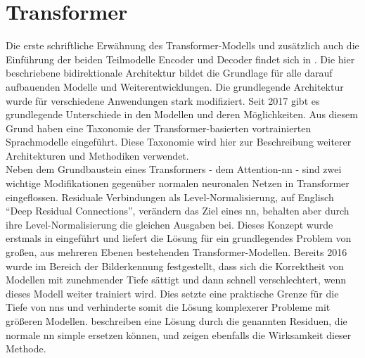 \section{Transformer}\label{sec:transformer}
%
Die erste schriftliche Erwähnung des Transformer-Modells und zusätzlich auch die Einführung der beiden Teilmodelle Encoder und Decoder findet sich in \citet{attention}.
Die hier beschriebene bidirektionale Architektur bildet die Grundlage für alle darauf aufbauenden Modelle und Weiterentwicklungen. 
Die grundlegende Architektur wurde für verschiedene Anwendungen stark modifiziert. 
Seit 2017 gibt es grundlegende Unterschiede in den Modellen und deren Möglichkeiten. 
Aus diesem Grund haben \citet{ammus} eine Taxonomie der Transformer-basierten vortrainierten Sprachmodelle eingeführt. 
Diese Taxonomie wird hier zur Beschreibung weiterer Architekturen und Methodiken verwendet.\\

Neben dem Grundbaustein eines Transformers - dem Attention-\ac{nn} - sind zwei wichtige Modifikationen gegenüber normalen neuronalen Netzen in Transformer eingeflossen. 
Residuale Verbindungen als Level-Normalisierung, auf Englisch \enquote{Deep Residual Connections}, verändern das Ziel eines \ac{nn}, behalten aber durch ihre Level-Normalisierung die gleichen Ausgaben bei. 
Dieses Konzept wurde erstmals in \citet{deep_residual} eingeführt und liefert die Lösung für ein grundlegendes Problem von großen, aus mehreren Ebenen bestehenden Transformer-Modellen. 
Bereits 2016 wurde im Bereich der Bilderkennung festgestellt, dass sich die Korrektheit von Modellen mit zunehmender Tiefe sättigt und dann schnell verschlechtert, wenn dieses Modell weiter trainiert wird. 
Dies setzte eine praktische Grenze für die Tiefe von \ac{nn}s und verhinderte somit die Lösung komplexerer Probleme mit größeren Modellen. 
\citet{deep_residual} beschreiben eine Lösung durch die genannten Residuen, die normale \ac{nn} simple ersetzen können, und zeigen ebenfalls die Wirksamkeit dieser Methode.\\

